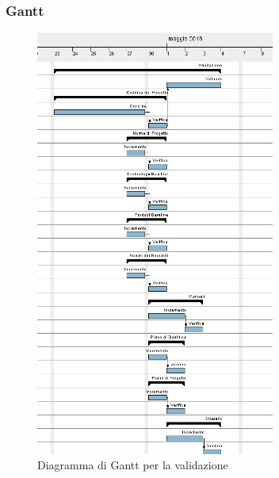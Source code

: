 \subsubsection{Gantt}
\begin{figure}[H]
	\centering 
	\includegraphics[width=0.7\textwidth]{images/Validazione.png}
	\caption{Diagramma di Gantt per la validazione}
	\label{graficobello6} 
\end{figure}
